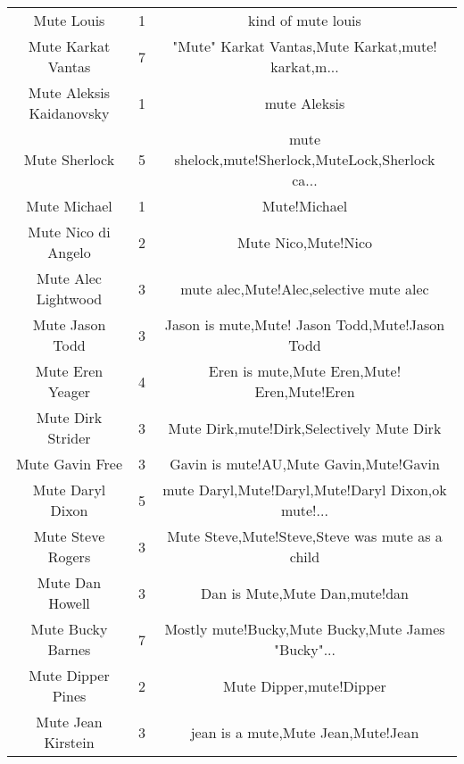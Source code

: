 \begin{table}[h!]
{\begin{tabular}{|c|c|c|}
                                        Mute Louis &      1 &                                 kind of mute louis \\
                                Mute Karkat Vantas &      7 & "Mute" Karkat Vantas,Mute Karkat,mute! karkat,m... \\
                          Mute Aleksis Kaidanovsky &      1 &                                       mute Aleksis \\
                                     Mute Sherlock &      5 & mute shelock,mute!Sherlock,MuteLock,Sherlock ca... \\
                                      Mute Michael &      1 &                                       Mute!Michael \\
                               Mute Nico di Angelo &      2 &                                Mute Nico,Mute!Nico \\
                               Mute Alec Lightwood &      3 &            mute alec,Mute!Alec,selective mute alec \\
                                   Mute Jason Todd &      3 &     Jason is mute,Mute! Jason Todd,Mute!Jason Todd \\
                                  Mute Eren Yeager &      4 &        Eren is mute,Mute Eren,Mute! Eren,Mute!Eren \\
                                 Mute Dirk Strider &      3 &          Mute Dirk,mute!Dirk,Selectively Mute Dirk \\
                                   Mute Gavin Free &      3 &             Gavin is mute!AU,Mute Gavin,Mute!Gavin \\
                                  Mute Daryl Dixon &      5 & mute Daryl,Mute!Daryl,Mute!Daryl Dixon,ok mute!... \\
                                 Mute Steve Rogers &      3 &    Mute Steve,Mute!Steve,Steve was mute as a child \\
                                   Mute Dan Howell &      3 &                      Dan is Mute,Mute Dan,mute!dan \\
                                 Mute Bucky Barnes &      7 & Mostly mute!Bucky,Mute Bucky,Mute James "Bucky"... \\
                                 Mute Dipper Pines &      2 &                            Mute Dipper,mute!Dipper \\
                                Mute Jean Kirstein &      3 &                 jean is a mute,Mute Jean,Mute!Jean \\

\end{tabular}}
\end{table}
